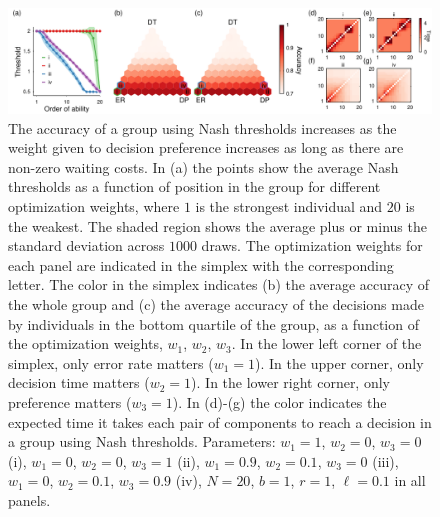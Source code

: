 \documentclass{pnastwo}
\begin{document}
\begin{figure}[htp]
\includegraphics[width=6.83in]{Figure2.pdf}
\caption{\label{groupeq}   The accuracy of a group using Nash thresholds increases as the weight given to decision preference increases as long as there are non-zero waiting costs.  In (a) the points show the average Nash thresholds as a function of position in the group for different optimization weights, where $1$ is the strongest individual and $20$ is the weakest. The shaded region shows the average plus or minus the standard deviation across $1000$ draws.  The optimization weights for each panel are indicated in the simplex with the corresponding letter. The color in the simplex indicates (b) the average accuracy of the whole group and (c) the average accuracy of the decisions made by individuals in the bottom quartile of the group, as a function of the optimization weights, $w_1$, $w_2$, $w_3$.  In the lower left corner of the simplex, only error rate matters ($w_1=1$).  In the upper corner, only decision time matters ($w_2=1$).  In the lower right corner, only preference matters ($w_3=1$).   In (d)-(g) the color indicates the expected time it takes each pair of components to reach a decision in a group using Nash thresholds. Parameters: $w_1=1$, $w_2=0$, $w_3=0$ (i), $w_1=0$, $w_2=0$, $w_3=1$ (ii), $w_1=0.9$, $w_2=0.1$, $w_3=0$ (iii), $w_1=0$, $w_2=0.1$, $w_3=0.9$ (iv), $N=20$, $b=1$, $r=1$, $\ell=0.1$ in all panels. }

\end{figure}
\end{document}
